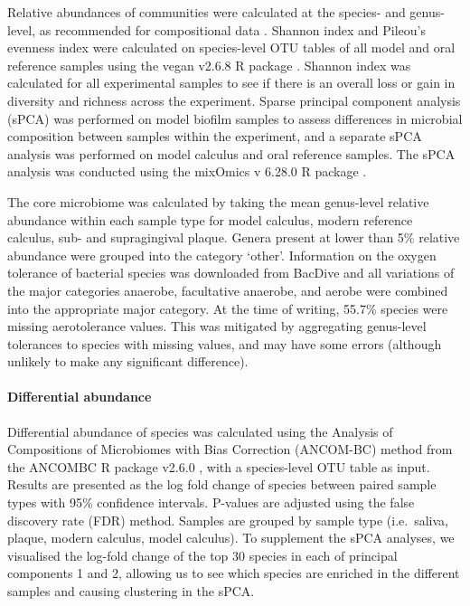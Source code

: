 \documentclass[10pt,a4paper]{article}
\begin{document}
Relative abundances of communities were calculated at the species- and
genus-level, as recommended for compositional data
\citep{gloorMicrobiomeDatasets2017}. Shannon index and Pileou's evenness
index were calculated on species-level OTU tables of all model and oral
reference samples using the vegan v2.6.8 R package \citep{Rvegan}.
Shannon index was calculated for all experimental samples to see if
there is an overall loss or gain in diversity and richness across the
experiment. Sparse principal component analysis (sPCA) was performed on
model biofilm samples to assess differences in microbial composition
between samples within the experiment, and a separate sPCA analysis was
performed on model calculus and oral reference samples. The sPCA
analysis was conducted using the mixOmics v 6.28.0 R package
\citep{RmixOmics}.

The core microbiome was calculated by taking the mean genus-level
relative abundance within each sample type for model calculus, modern
reference calculus, sub- and supragingival plaque. Genera present at
lower than 5\% relative abundance were grouped into the category
`other'. Information on the oxygen tolerance of bacterial species was
downloaded from BacDive \citep{reimerBacDive2022} and all variations of
the major categories anaerobe, facultative anaerobe, and aerobe were
combined into the appropriate major category. At the time of writing,
55.7\% species were missing aerotolerance values. This was mitigated by
aggregating genus-level tolerances to species with missing values, and
may have some errors (although unlikely to make any significant
difference).

\paragraph{Differential abundance}\label{differential-abundance}

Differential abundance of species was calculated using the Analysis of
Compositions of Microbiomes with Bias Correction (ANCOM-BC) method from
the ANCOMBC R package v2.6.0 \citep{linANCOMBC2020}, with a
species-level OTU table as input. Results are presented as the log fold
change of species between paired sample types with 95\% confidence
intervals. P-values are adjusted using the false discovery rate (FDR)
method. Samples are grouped by sample type (i.e.~saliva, plaque, modern
calculus, model calculus). To supplement the sPCA analyses, we
visualised the log-fold change of the top 30 species in each of
principal components 1 and 2, allowing us to see which species are
enriched in the different samples and causing clustering in the sPCA.
\end{document}
